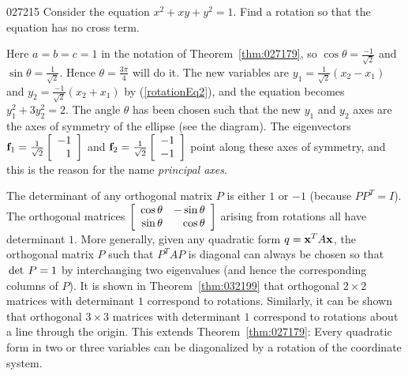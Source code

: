 \begin{example}{}{027215}
Consider the equation $x^{2} + xy + y^{2} = 1$. Find a rotation so that the equation has no cross term.

\begin{solution}
\begin{wrapfigure}[9]{l}{5cm}
\centering

\end{wrapfigure}

\setlength{\rightskip}{0pt plus 200pt}
Here $a = b = c = 1$ in the notation of Theorem~\ref{thm:027179}, so $\cos\theta = \frac{-1}{\sqrt{2}}$ and $\sin\theta = \frac{1}{\sqrt{2}}$. Hence $\theta = \frac{3\pi}{4}$ will do it. The new variables are $y_{1} = \frac{1}{\sqrt{2}}(x_{2} - x_{1})$ and $y_{2} = \frac{-1}{\sqrt{2}}(x_{2} + x_{1})$ by (\ref{rotationEq2}), and the equation becomes $y_{1}^2 + 3y_{2}^2 = 2$. The angle $\theta$ has been chosen such that the new $y_{1}$ and $y_{2}$ axes are the axes of symmetry of the ellipse (see the diagram). The eigenvectors $\textbf{f}_{1} = \tfrac{1}{\sqrt{2}} \left[ \begin{array}{r}
 -1 \\
 1
 \end{array}\right]$
 and $\textbf{f}_{2} = \tfrac{1}{\sqrt{2}} \left[ \begin{array}{r}
 -1 \\
 -1
 \end{array}\right]$
 point along these axes of symmetry, and this is the reason for the name \textit{principal axes}.
\end{solution}
\end{example}

The determinant of any orthogonal matrix $P$ is either $1$ or $-1$ (because $PP^{T} = I$). The orthogonal matrices $\left[ \begin{array}{rr}
\cos\theta & -\sin\theta \\
\sin\theta & \cos\theta
\end{array}\right]$ arising from rotations all have determinant $1$. More generally, given any quadratic form $q = \textbf{x}^{T}A\textbf{x}$, the orthogonal matrix $P$ such that $P^{T}AP$ is diagonal can always be chosen so that $\thinspace\operatorname{det \medspace}P = 1$ by interchanging two eigenvalues (and hence the corresponding columns of $P$). It is shown in Theorem~\ref{thm:032199} that orthogonal $2 \times 2$ matrices with determinant $1$ correspond to rotations. Similarly, it can be shown that orthogonal $3 \times 3$ matrices with determinant $1$ correspond to rotations about a line through the origin. This extends Theorem~\ref{thm:027179}: Every quadratic form in two or three variables can be diagonalized by a rotation of the coordinate system.


